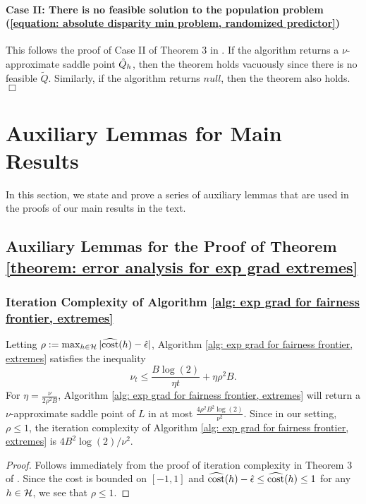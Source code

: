 \documentclass{article}
\begin{document}
\paragraph{Case II: There is no feasible solution to the population problem (\ref{equation: absolute disparity min problem, randomized predictor})} This follows the proof of Case II of Theorem 3 in \cite{AgarwalEtAl(19)-FairRegression}. If the algorithm returns a $\nu$-approximate saddle point $\hat{Q}_h$, then the theorem holds vacuously since there is no feasible $\tilde Q$. Similarly, if the algorithm returns $null$, then the theorem also holds. $\Box$

\section{Auxiliary Lemmas for Main Results}\label{section: auxiliary lemmas}

In this section, we state and prove a series of auxiliary lemmas that are used in the proofs of our main results in the text.

\subsection{Auxiliary Lemmas for the Proof of Theorem \ref{theorem: error analysis for exp grad extremes}} 

\subsubsection{Iteration Complexity of Algorithm \ref{alg: exp grad for fairness frontier, extremes}} 

\begin{lemma}\label{lemma: iteration complexity for extremes}
    Letting $\rho := \max_{h \in \mathcal{H}} | \widehat{\operatorname{cost}}(h) - \hat{\epsilon} |$, Algorithm \ref{alg: exp grad for fairness frontier, extremes} satisfies the inequality 
        \begin{equation*}
            \nu_{t} \leq \frac{B \log(2) }{ \eta t} + \eta \rho^2 B.
        \end{equation*}
    For $\eta = \frac{\nu}{2 \rho^2 B}$, Algorithm \ref{alg: exp grad for fairness frontier, extremes} will return a $\nu$-approximate saddle point of $L$ in at most $ \frac{4 \rho^2 B^2 \log(2)}{\nu^2}$. Since in our setting, $\rho \leq 1$, the iteration complexity of Algorithm \ref{alg: exp grad for fairness frontier, extremes} is $4 B^2 \log(2)/\nu^2$. 
    
    \begin{proof}
        Follows immediately from the proof of iteration complexity in Theorem 3 of \cite{AgarwalEtAl(19)-FairRegression}. Since the cost is bounded on $[-1, 1]$ and $\widehat{\operatorname{cost}}(h) - \hat{\epsilon} \leq \widehat{\operatorname{cost}}(h) \leq 1$ for any $h \in \mathcal{H}$, we see that $\rho \leq 1$.
    \end{proof}
\end{lemma}
\end{document}
